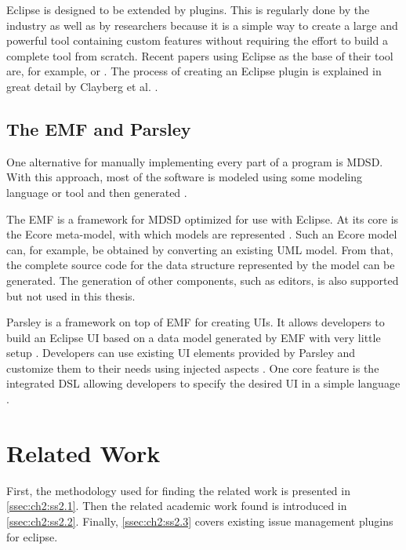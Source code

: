 Eclipse is designed to be extended by plugins. This is regularly done by the industry as well as by researchers 
because it is a simple way to create a large and powerful tool containing custom features 
without requiring the effort to build a complete tool from scratch. 
Recent papers using Eclipse as the base of their tool are, for example, \cite{segura2019extremo} or \cite{hajji2019onto2db}. 
The process of creating an Eclipse plugin is explained in great detail by Clayberg et al. \cite{clayberg2006eclipse}.

\subsection{The \acrlong{EMF} and \gls{Parsley} }
\label{ssec:ch2:ss1.4}
One alternative for manually implementing every part of a program is \gls{MDSD}.
With this approach, most of the software is modeled using some modeling language or tool and then generated \cite{volter2013model}. 

The \gls{EMF} is a framework for \gls{MDSD} optimized for use with \gls{Eclipse}.
At its core is the Ecore meta-model, with which models are represented \cite{steinberg2008emf}.
Such an Ecore model can, for example, be obtained by converting an existing \gls{UML} model.
From that, the complete source code for the data structure represented by the model can be generated.
The generation of other components, such as editors, is also supported but not used in this thesis.

\Gls{Parsley} is a framework on top of \gls{EMF} for creating \glspl{UI}.
It allows developers to build an \gls{Eclipse} \gls{UI} based on a data model generated by \gls{EMF} with very little setup \cite{bettini2014developing}.
Developers can use existing \gls{UI} elements provided by \gls{Parsley} and customize them to their needs using injected aspects  \cite{bettini2014developing}.
One core feature is the integrated \gls{DSL} allowing developers to specify the desired \gls{UI} in a simple language \cite{bettini2014developing}.

\section{Related Work}
\label{sec:ch2:s2}
First, the methodology used for finding the related work is presented in \cref{ssec:ch2:ss2.1}.
Then the related academic work found is introduced in \cref{ssec:ch2:ss2.2}.
Finally, \cref{ssec:ch2:ss2.3} covers existing issue management plugins for eclipse.

